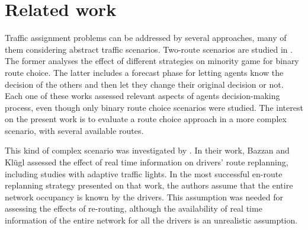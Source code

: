 \documentclass{RITA}
\begin{document}
\section{Related work}
\label{sec:related}




Traffic assignment problems can be addressed by several approaches, many of them considering abstract traffic scenarios. Two-route scenarios are studied in \cite{Bazzan+2000icmas,Kluegl&Bazzan2004}. The former analyses the effect of different strategies on minority game for binary route choice. The latter includes a forecast phase for letting agents know the decision of the others and then let they change their original decision or not. Each one of these works assessed relevant aspects of agents decision-making process, even though only binary route choice scenarios were studied. The interest on the present work is to evaluate a route choice approach in a more complex scenario, with several available routes.

This kind of complex scenario was investigated by \cite{Bazzan&Kluegl2008}. In their work, Bazzan and Kl\"ugl assessed the effect of real time information on drivers' route replanning, including studies with adaptive traffic lights. In the most successful en-route replanning strategy presented on that work, the authors assume that the entire network occupancy is known by the drivers. This assumption was needed for assessing the effects of re-routing, although the availability of real time information of the entire network for all the drivers is an unrealistic assumption.
\end{document}

